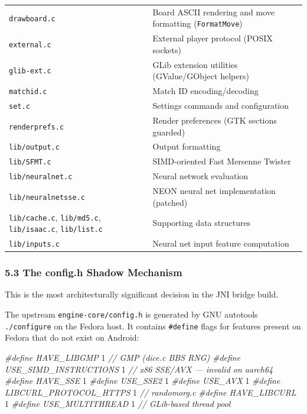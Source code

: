 \documentclass[11pt,a4paper]{article}
\newenvironment{Shaded}{%
  \setlength{\FrameSep}{4pt}%
  \definecolor{shadecolor}{RGB}{245,245,245}%
  \begin{snugshade}\footnotesize
}{\end{snugshade}}
\newcommand{\CommentTok}[1]{\textcolor[rgb]{0.56,0.35,0.01}{\textit{#1}}}
\newcommand{\DecValTok}[1]{\textcolor[rgb]{0.00,0.00,0.81}{#1}}
\newcommand{\PreprocessorTok}[1]{\textcolor[rgb]{0.56,0.35,0.01}{\textit{#1}}}
\begin{document}
\begin{longtable}[]{@{}
  >{\raggedright\arraybackslash}p{}
  >{\raggedright\arraybackslash}p{}@{}}
\texttt{drawboard.c} & Board ASCII rendering and move formatting
(\texttt{FormatMove}) \\
\texttt{external.c} & External player protocol (POSIX sockets) \\
\texttt{glib-ext.c} & GLib extension utilities (GValue/GObject
helpers) \\
\texttt{matchid.c} & Match ID encoding/decoding \\
\texttt{set.c} & Settings commands and configuration \\
\texttt{renderprefs.c} & Render preferences (GTK sections guarded) \\
\texttt{lib/output.c} & Output formatting \\
\texttt{lib/SFMT.c} & SIMD-oriented Fast Mersenne Twister \\
\texttt{lib/neuralnet.c} & Neural network evaluation \\
\texttt{lib/neuralnetsse.c} & NEON neural net implementation
(patched) \\
\texttt{lib/cache.c}, \texttt{lib/md5.c}, \texttt{lib/isaac.c},
\texttt{lib/list.c} & Supporting data structures \\
\texttt{lib/inputs.c} & Neural net input feature computation \\
\end{longtable}

\subsubsection{5.3 The config.h Shadow
Mechanism}\label{the-config.h-shadow-mechanism}

This is the most architecturally significant decision in the JNI bridge
build.

The upstream \texttt{engine-core/config.h} is generated by GNU autotools
\texttt{./configure} on the Fedora host. It contains \texttt{\#define}
flags for features present on Fedora that do not exist on Android:

\begin{Shaded}
\begin{Highlighting}[]
\PreprocessorTok{\#define HAVE\_LIBGMP }\DecValTok{1}\PreprocessorTok{            }\CommentTok{// GMP (dice.c BBS RNG)}
\PreprocessorTok{\#define USE\_SIMD\_INSTRUCTIONS }\DecValTok{1}\PreprocessorTok{  }\CommentTok{// x86 SSE/AVX — invalid on aarch64}
\PreprocessorTok{\#define HAVE\_SSE }\DecValTok{1}
\PreprocessorTok{\#define USE\_SSE2 }\DecValTok{1}
\PreprocessorTok{\#define USE\_AVX }\DecValTok{1}
\PreprocessorTok{\#define LIBCURL\_PROTOCOL\_HTTPS }\DecValTok{1}\PreprocessorTok{ }\CommentTok{// randomorg.c}
\PreprocessorTok{\#define HAVE\_LIBCURL }\DecValTok{1}
\PreprocessorTok{\#define USE\_MULTITHREAD }\DecValTok{1}\PreprocessorTok{        }\CommentTok{// GLib{-}based thread pool}
\end{Highlighting}
\end{Shaded}
\end{document}
